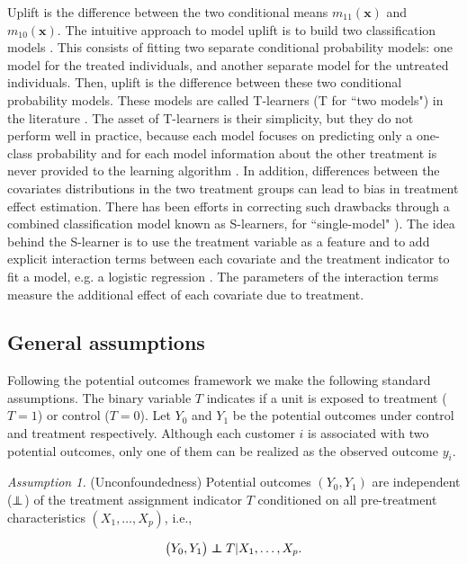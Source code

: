 \documentclass{article}
\newcommand\independent{\protect\mathpalette{\protect\independenT}{\perp}}
\def\independenT#1#2{\mathrel{\rlap{$#1#2$}\mkern2mu{#1#2}}}
\def\x{\mathbf x}
\begin{document}
Uplift is the difference between the two conditional means $m_{11}(\x)$ and $m_{10}(\x)$. The intuitive approach to model uplift is to build two classification models \citep{hansotia2002direct,snowden2011implementation,austin2012using}. This consists of fitting two separate conditional probability models: one model for the treated individuals, and another separate model for the untreated individuals. Then, uplift is the difference between these two conditional probability models. These models are called T-learners (T for ``two models") in the literature \citep{kunzel2019metalearners}. The asset of T-learners is their simplicity, but they do not perform well in practice, because each model focuses on predicting only a one-class probability and for each model information about the other treatment is never provided to the learning algorithm \citep{radcliffe2011real}. In addition, differences between the covariates distributions in the two treatment groups can lead to bias in treatment effect estimation. There has been efforts in correcting such drawbacks through a combined classification model known as S-learners, for ``single-model" \citep{kunzel2019metalearners}). The idea behind the S-learner is to use the treatment variable as a feature and to add explicit interaction terms between each covariate and the treatment indicator to  fit a model, e.g. a logistic regression \citep{lo2002true}. The parameters of the interaction terms measure the additional effect of each covariate due to treatment.


\subsection{General assumptions}

Following the potential outcomes framework \citep{holland1986statistics} we make the following standard assumptions. The binary variable $T$ indicates if a unit is exposed to treatment ($T=1$) or control ($T=0$). Let $Y_0$  and $Y_1$ be the potential outcomes under control and treatment respectively. Although each customer $i$ is associated with two potential outcomes, only one of them can be realized as the observed outcome $y_i$. 

{\it Assumption 1.} (Unconfoundedness) Potential outcomes $(Y_0,Y_1)$ are independent ($\independent$) of the treatment assignment indicator $T$ conditioned on all pre-treatment characteristics $(X_1, \ldots, X_p)$, i.e.,

$$\big( Y_0, Y_1 \big) \independent T | X_1,\ldots,X_p. $$
\end{document}
